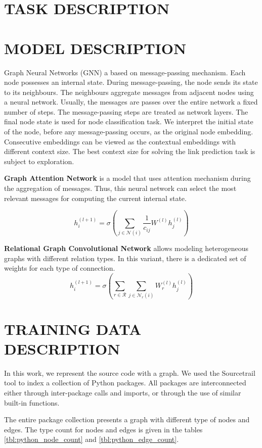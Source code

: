 \documentclass[a4paper,twoside]{article}
\begin{document}
\section{\uppercase{Task Description}}

\section{\uppercase{Model Description}}

Graph Neural Networks (GNN) a based on message-passing mechanism. Each node possesses an internal state. During message-passing, the node sends its state to its neighbours. The neighbours aggregate messages from adjacent nodes using a neural network. Usually, the messages are passes over the entire network a fixed number of steps. The message-passing steps are treated as network layers. The final node state is used for node classification task. We interpret the initial state of the node, before any message-passing occurs, as the original node embedding. Consecutive embeddings can be viewed as the contextual embeddings with different context size. The best context size for solving the link prediction task is subject to exploration.

\textbf{Graph Attention Network} is a model that uses attention mechanism during the aggregation of messages. Thus, this neural network can select the most relevant messages for computing the current internal state.

$$
h_i^{(l+1)}=\sigma\left(\sum_{j\in \mathcal{N}(i)} {\frac{1}{c_{ij}} W^{(l)}h^{(l)}_j}\right)
$$

\textbf{Relational Graph Convolutional Network} allows modeling heterogeneous graphs with different relation types. In this variant, there is a dedicated set of weights for each type of connection. 
$$
h_i^{(l+1)} = \sigma\left(\sum_{r\in \mathcal{R}}
\sum_{j\in\mathcal{N}_r(i)}W_r^{(l)}h_j^{(l)}\right)
$$


\section{\uppercase{Training Data Description}}

In this work, we represent the source code with a graph. We used the Sourcetrail tool to index a collection of Python packages. All packages are interconnected either through inter-package calls and imports, or through the use of similar built-in functions. 

The entire package collection presents a graph with different type of nodes and edges. The type count for nodes and edges is given in the tables \ref{tbl:python_node_count} and \ref{tbl:python_edge_count}. 
\end{document}
